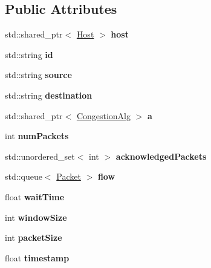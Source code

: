 \subsection*{\-Public \-Attributes}
\begin{DoxyCompactItemize}
\item 
\hypertarget{classFlow_af45cdc7b3609577eb08cb072e9631809}{std\-::shared\-\_\-ptr$<$ \hyperlink{classHost}{\-Host} $>$ {\bfseries host}}\label{classFlow_af45cdc7b3609577eb08cb072e9631809}

\item 
\hypertarget{classFlow_a8724a8f4ce94cf7bfb0db79e688ed179}{std\-::string {\bfseries id}}\label{classFlow_a8724a8f4ce94cf7bfb0db79e688ed179}

\item 
\hypertarget{classFlow_a36eb3e23b0804647c30be41835b790b3}{std\-::string {\bfseries source}}\label{classFlow_a36eb3e23b0804647c30be41835b790b3}

\item 
\hypertarget{classFlow_a536685c38def6cf8b61d0fb0d7e8372d}{std\-::string {\bfseries destination}}\label{classFlow_a536685c38def6cf8b61d0fb0d7e8372d}

\item 
\hypertarget{classFlow_aaed7f19c7331e59bb123da68239807bc}{std\-::shared\-\_\-ptr$<$ \hyperlink{classCongestionAlg}{\-Congestion\-Alg} $>$ {\bfseries a}}\label{classFlow_aaed7f19c7331e59bb123da68239807bc}

\item 
\hypertarget{classFlow_a78d725176506b21ce2355b3742ab8c17}{int {\bfseries num\-Packets}}\label{classFlow_a78d725176506b21ce2355b3742ab8c17}

\item 
\hypertarget{classFlow_a8c9d7d593004b45b1a1a88932598e9ec}{std\-::unordered\-\_\-set$<$ int $>$ {\bfseries acknowledged\-Packets}}\label{classFlow_a8c9d7d593004b45b1a1a88932598e9ec}

\item 
\hypertarget{classFlow_ae211f68d0d38e1625b06138aa71ff30c}{std\-::queue$<$ \hyperlink{classPacket}{\-Packet} $>$ {\bfseries flow}}\label{classFlow_ae211f68d0d38e1625b06138aa71ff30c}

\item 
\hypertarget{classFlow_a6b1bc90a9171baefb34683ce49ab4db6}{float {\bfseries wait\-Time}}\label{classFlow_a6b1bc90a9171baefb34683ce49ab4db6}

\item 
\hypertarget{classFlow_ab567b4507276eeb779a109c459545988}{int {\bfseries window\-Size}}\label{classFlow_ab567b4507276eeb779a109c459545988}

\item 
\hypertarget{classFlow_ac5af37a8637ec606977ebc1e33a0c59b}{int {\bfseries packet\-Size}}\label{classFlow_ac5af37a8637ec606977ebc1e33a0c59b}

\item 
\hypertarget{classFlow_ac46a1249858fde4c562938948bfb13aa}{float {\bfseries timestamp}}\label{classFlow_ac46a1249858fde4c562938948bfb13aa}

\end{DoxyCompactItemize}


